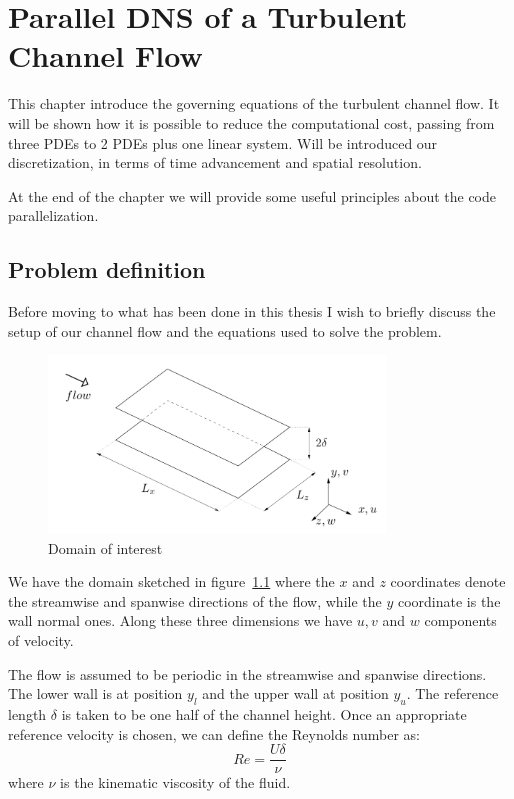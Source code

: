 \chapter{Parallel DNS of a Turbulent Channel Flow}

This chapter introduce the governing equations of the turbulent channel flow. It will be shown how it is possible to reduce the computational cost, passing from three PDEs to 2 PDEs plus one linear system. Will be introduced our discretization, in terms of time advancement and spatial resolution. \par At the end of the chapter we will provide some useful principles about the code parallelization.

\section{Problem definition}
\pagestyle{headings}

Before moving to what has been done in this thesis I wish to briefly discuss the setup of our channel flow and the equations used to solve the problem.

\begin{figure}[h]
\centering
\includegraphics[width=0.8\textwidth]{grafici/sketch_dominio}
\caption{Domain of interest}
\label{sketch_dominio}
\end{figure}

We have the domain sketched in figure~\ref{sketch_dominio} where the $x$ and $z$ coordinates denote the streamwise and spanwise directions of the flow, while the $y$ coordinate is the wall normal ones.
Along these three dimensions we have $u,v$ and $w$ components of velocity.

The flow is assumed to be periodic in the streamwise and spanwise directions. The lower wall is at position $y_l$ and the upper wall at position $y_u$. The reference length $\delta$ is taken to be one half of the channel height.
Once an appropriate reference velocity is chosen, we can define the Reynolds number as:
\[
Re = \frac{U\delta}{\nu}
\]
where $\nu$ is the kinematic viscosity of the fluid.

